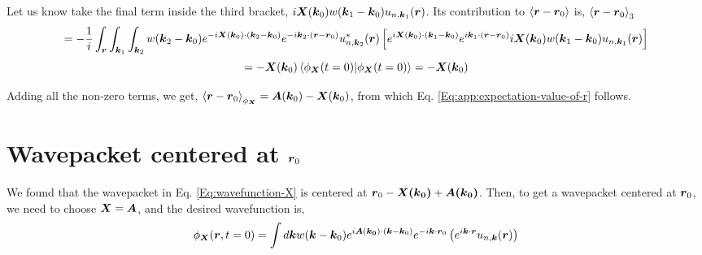 \documentclass{report}
\renewcommand\vec[1]{\ensuremath\boldsymbol{#1}} %
\begin{document}
 Let us know take the final term inside the third bracket, $i \vec{X}(\vec{k}_0) w(\vec{k}_1 - \vec{k}_0) u_{n,\vec{k}_1}(\vec{r})$. Its contribution to $\expval{\vec{r} - \vec{r}_0}$ is, $ \expval{\vec{r} - \vec{r}_0}_3$
 $$ = -\frac{1}{i} \int_{\vec{r}} \int_{\vec{k}_1} \int_{\vec{k}_2} w(\vec{k}_2 - \vec{k}_0) e^{-i \vec{X}(\vec{k}_0)\cdot (\vec{k}_2 - \vec{k}_0)} e^{-i \vec{k}_2 \cdot (\vec{r} - \vec{r}_0)} u^*_{n,\vec{k}_2}(\vec{r}) \left[e^{i \vec{X}(\vec{k}_0)\cdot (\vec{k}_1 - \vec{k}_0)} e^{i \vec{k}_1 \cdot (\vec{r} - \vec{r}_0)} i \vec{X}(\vec{k}_0) w(\vec{k}_1 - \vec{k}_0) u_{n,\vec{k}_1}(\vec{r})\right]$$
 $$= -\vec{X}(\vec{k}_0) \bra{\phi_{\vec{X}}(t=0)}\ket{\phi_{\vec{X}}(t=0)} = -\vec{X}(\vec{k}_0)$$
 
 Adding all the non-zero terms, we get,
$ \expval{\vec{r} - \vec{r}_0}_{\phi_{\vec{X}}} = \vec{A}(\vec{k}_0) -\vec{X}(\vec{k}_0) $, from which Eq. \eqref{Eq:app:expectation-value-of-r} follows.

\section{Wavepacket centered at $\vec{r}_0$}
We found that the wavepacket in Eq. \eqref{Eq:wavefunction-X} is centered at $\vec{r}_0 - \vec{X(\vec{k}_0)} + \vec{A(\vec{k}_0)}$. Then, to get a wavepacket centered at $\vec{r}_0$, we need to choose $\vec{X} = \vec{A}$, and the desired wavefunction is,
\begin{equation}\label{Eq:wavefunction-r0}
	\phi_{\vec{X}}(\vec{r}, t=0) = \int d\vec{k} w(\vec{k} - \vec{k}_0) e^{i \vec{A}(\vec{k_0})\cdot (\vec{k} - \vec{k}_0)} e^{-i \vec{k} \cdot \vec{r}_0 } \left(e^{i \vec{k} \cdot\vec{r}} u_{n,\vec{k}}(\vec{r})\right)
\end{equation}
\end{document}
